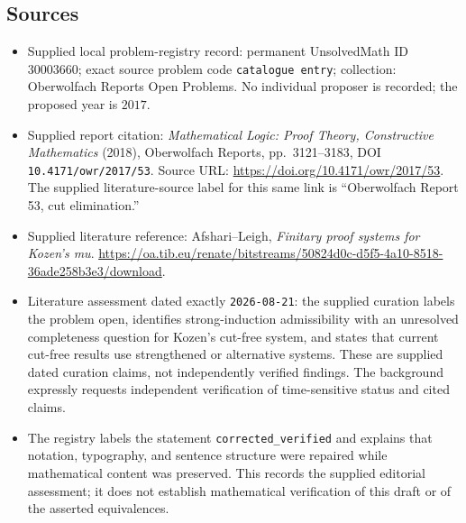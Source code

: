 \documentclass[11pt]{article}
\begin{document}
\subsection{Sources}
\begin{itemize}
\item Supplied local problem-registry record: permanent UnsolvedMath ID $30003660$; exact source problem code \texttt{catalogue entry}; collection: Oberwolfach Reports Open Problems. No individual proposer is recorded; the proposed year is $2017$.
\item Supplied report citation: \emph{Mathematical Logic: Proof Theory, Constructive Mathematics} (2018), Oberwolfach Reports, pp.~3121--3183, DOI \texttt{10.4171/owr/2017/53}. Source URL: \url{https://doi.org/10.4171/owr/2017/53}. The supplied literature-source label for this same link is ``Oberwolfach Report 53, cut elimination.''
\item Supplied literature reference: Afshari--Leigh, \emph{Finitary proof systems for Kozen's mu}. \url{https://oa.tib.eu/renate/bitstreams/50824d0c-d5f5-4a10-8518-36ade258b3e3/download}.
\item Literature assessment dated exactly \texttt{2026-08-21}: the supplied curation labels the problem open, identifies strong-induction admissibility with an unresolved completeness question for Kozen's cut-free system, and states that current cut-free results use strengthened or alternative systems. These are supplied dated curation claims, not independently verified findings. The background expressly requests independent verification of time-sensitive status and cited claims.
\item The registry labels the statement \texttt{corrected\_verified} and explains that notation, typography, and sentence structure were repaired while mathematical content was preserved. This records the supplied editorial assessment; it does not establish mathematical verification of this draft or of the asserted equivalences.
\end{itemize}
\end{document}
